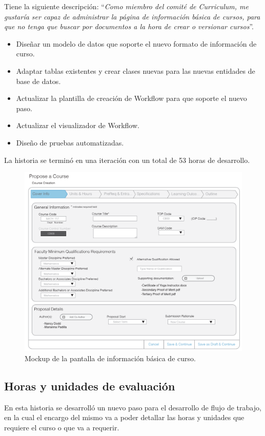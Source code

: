 Tiene la siguiente descripción: \enquote{\textit{Como miembro del comité de Curriculum, me gustaría ser capaz de administrar la página de información básica de cursos, para que no tenga que buscar por documentos a la hora de crear o versionar cursos}}.

\begin{itemize}
	\item Diseñar un modelo de datos que soporte el nuevo formato de información de curso.
	\item Adaptar tablas existentes y crear clases nuevas para las nuevas entidades de base de datos.
	\item Actualizar la plantilla de creación de Workflow para que soporte el nuevo paso.
	\item Actualizar el visualizador de Workflow.
	\item Diseño de pruebas automatizadas.
\end{itemize}

La historia se terminó en una iteración con un total de 53 horas de desarrollo.

\begin{figure}[H]
\centering
\includegraphics[scale=0.3]{Capitulos/DesarrollodelaAplicacion/Imagenes/course_cover_info}
\caption{Mockup de la pantalla de información básica de curso.}
  \label{course_cover_info}
\end{figure}

\subsection{Horas y unidades de evaluación}
En esta historia se desarrolló un nuevo paso para el desarrollo de flujo de trabajo, en la cual el encargo del mismo va a poder detallar las horas y unidades que requiere el curso o que va a requerir.

